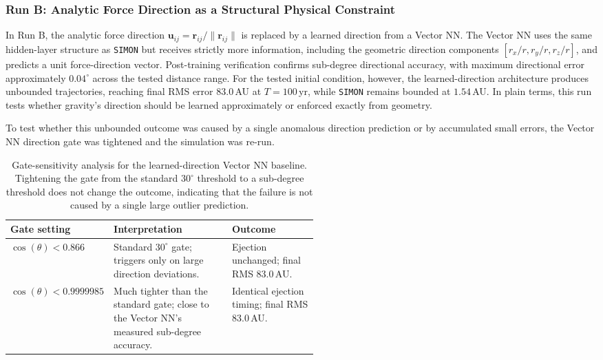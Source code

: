 \documentclass[12pt]{article}
\begin{document}
\subsubsection{Run B: Analytic Force Direction as a Structural Physical Constraint}
\label{sec:run_b}

In Run B, the analytic force direction $\mathbf{u}_{ij} = \mathbf{r}_{ij}/\|\mathbf{r}_{ij}\|$ is replaced by a learned direction from a Vector NN. The Vector NN uses the same hidden-layer structure as \texttt{SIMON} but receives strictly more information, including the geometric direction components $[r_x/r, r_y/r, r_z/r]$, and predicts a unit force-direction vector. Post-training verification confirms sub-degree directional accuracy, with maximum directional error approximately $0.04^\circ$ across the tested distance range. For the tested initial condition, however, the learned-direction architecture produces unbounded trajectories, reaching final RMS error $83.0$\,AU at $T = 100$\,yr, while \texttt{SIMON} remains bounded at $1.54$\,AU. In plain terms, this run tests whether gravity's direction should be learned approximately or enforced exactly from geometry.

To test whether this unbounded outcome was caused by a single anomalous direction prediction or by accumulated small errors, the Vector NN direction gate was tightened and the simulation was re-run.

\begin{table}[H]
\centering
\caption{Gate-sensitivity analysis for the learned-direction Vector NN baseline. Tightening the gate from the standard $30^\circ$ threshold to a sub-degree threshold does not change the outcome, indicating that the failure is not caused by a single large outlier prediction.}
\label{tab:vector_gate_sensitivity}
\begin{tabularx}{\linewidth}{
    >{\raggedright\arraybackslash}p{0.24\linewidth}
    >{\raggedright\arraybackslash}X
    >{\raggedright\arraybackslash}p{0.28\linewidth}
}
\toprule
\textbf{Gate setting} & \textbf{Interpretation} & \textbf{Outcome} \\
\midrule
$\cos(\theta) < 0.866$
&
Standard $30^\circ$ gate; triggers only on large direction deviations.
&
Ejection unchanged; final RMS $83.0$\,AU.
\\
\addlinespace
$\cos(\theta) < 0.9999985$
&
Much tighter than the standard gate; close to the Vector NN's measured sub-degree accuracy.
&
Identical ejection timing; final RMS $83.0$\,AU.
\\
\bottomrule
\end{tabularx}
\end{table}
\end{document}
